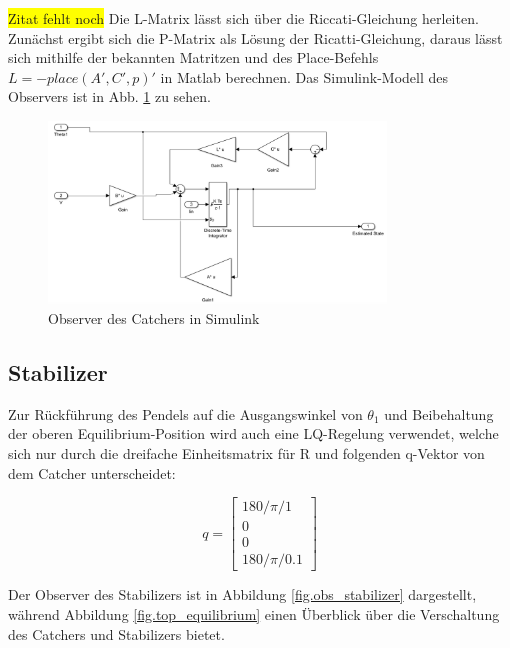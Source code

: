 \colorbox{yellow}{Zitat fehlt noch}
Die L-Matrix lässt sich über die Riccati-Gleichung \cite{Werner.2013} herleiten. Zunächst ergibt sich die P-Matrix als Lösung der Ricatti-Gleichung, daraus lässt sich mithilfe der bekannten Matritzen und des Place-Befehls $L=-place(A',C',p)'$ in Matlab berechnen.
Das Simulink-Modell des Observers ist in Abb. \ref{fig.obs_catcher} zu sehen.

\begin{figure}[htbp]
	\centering	
	\includegraphics[width=0.8\textwidth]{Grafiken/simulink_observer_catcher.png}
	\caption{Observer des Catchers in Simulink}
	\label{fig.obs_catcher}
\end{figure}

\subsection{Stabilizer}
\label{stabilizer} 

Zur Rückführung des Pendels auf die Ausgangswinkel von $\theta_1$ und Beibehaltung der oberen Equilibrium-Position wird auch eine LQ-Regelung verwendet, welche sich nur durch die dreifache Einheitsmatrix für R und folgenden q-Vektor von dem Catcher unterscheidet:

\begin{equation}
q =\begin{bmatrix}
         180/\pi/1 \\
         0\\
         0\\
         180/\pi/0.1
        \end{bmatrix}
\end{equation}

Der Observer des Stabilizers ist in Abbildung \ref{fig.obs_stabilizer} dargestellt, während Abbildung \ref{fig.top_equilibrium} einen Überblick über die Verschaltung des Catchers und Stabilizers bietet.

